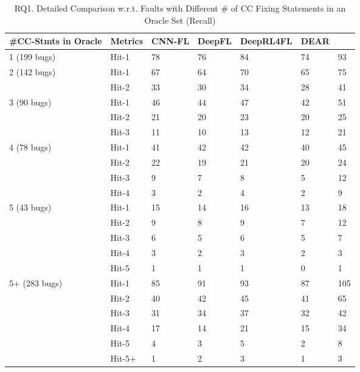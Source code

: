 \begin{table}[t]
	\caption{RQ1. Detailed Comparison w.r.t. Faults with Different \# of CC Fixing Statements in an Oracle Set (Recall)}
	\vspace{-10pt}
        \tabcolsep 2pt
	{\small
		\begin{center}
			\renewcommand{\arraystretch}{1}
			\begin{tabular}{p{1.5cm}<{\centering}|p{0.8cm}<{\centering}|p{1cm}<{\centering}|p{0.8cm}<{\centering}|p{1.3cm}<{\centering}|p{0.9cm}<{\centering}|p{1.3cm}<{\centering}}
				\hline
				\#CC-Stmts in Oracle & Metrics & CNN-FL & DeepFL & DeepRL4FL & DEAR & \tool \\
				\hline
				\multirow{1}{*}{1 (199 bugs)}   & Hit-1  & 78 & 76 & 84 & 74& 93 \\
				\hline
				\multirow{2}{*}{2 (142 bugs)}  & Hit-1   & 67 & 64 & 70 &65 & 75 \\
				& Hit-2         & 33 & 30 & 34 &28 & 41 \\
				\hline
				\multirow{3}{*}{3 (90 bugs)}  & Hit-1    & 46 & 44 & 47 &42 & 51 \\
				& Hit-2     & 21 & 20 & 23 & 20& 25\\
				& Hit-3     & 11 &10 & 13 &12 & 21 \\
				\hline
				\multirow{4}{*}{4 (78 bugs)}  & Hit-1    & 41 & 42 & 42 &40 & 45 \\
				& Hit-2     &22 & 19 & 21 &20 & 24 \\
				& Hit-3     & 9 & 7 & 8 &5 & 12 \\
				& Hit-4     & 3 & 2 & 4 &2 & 9 \\
				\hline
				\multirow{5}{*}{5 (43 bugs)}  & Hit-1    & 15 & 14 & 16 &13 & 18 \\
				& Hit-2     & 9 & 8 & 9 &7 & 12 \\
				& Hit-3     & 6 & 5 & 6 &5 & 7 \\
				& Hit-4     & 3 & 2 & 3 & 2& 3 \\
				& Hit-5     & 1 & 1 & 1 &0 & 1 \\
				\hline
				\multirow{6}{*}{5+ (283 bugs)}  & Hit-1 & 85 & 91 & 93 & 87 & 105 \\
				& Hit-2     & 40 & 42 & 45 & 41& 65 \\
				& Hit-3     & 31 & 34 & 37 & 32& 42 \\
				& Hit-4     & 17 & 14 & 21 & 15& 34 \\
				& Hit-5     & 4 & 3 & 5 & 2& 8 \\
				& Hit-5+    & 1 & 2 & 3 & 1& 3 \\
				\hline
			\end{tabular}
			

\end{center}}
\end{table}
